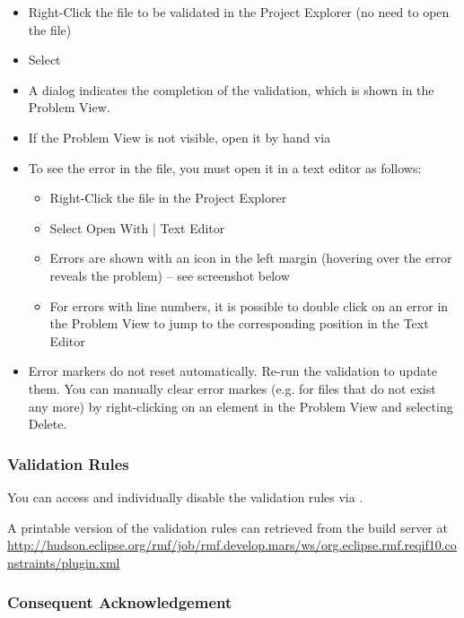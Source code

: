 \begin{itemize}
\item    Right-Click the file to be validated in the Project Explorer (no need to open the file)
\item    Select 
\item    A dialog indicates the completion of the validation, which is shown in the Problem View.
\item    If the Problem View is not visible, open it by hand via 
\item    To see the error in the file, you must open it in a text editor as follows:
\begin{itemize}
\item        Right-Click the file in the Project Explorer
\item        Select Open With | Text Editor
\item        Errors are shown with an icon in the left margin (hovering over the error reveals the problem) – see screenshot below
\item        For errors with line numbers, it is possible to double click on an error in the Problem View to jump to the corresponding position in the Text Editor
\end{itemize}

\item    Error markers do not reset automatically. Re-run the validation to update them. You can manually clear error markes (e.g. for files that do not exist any more) by right-clicking on an element in the Problem View and selecting Delete.
\end{itemize}

\subsubsection{Validation Rules}

You can access and individually disable the validation rules via .

\begin{info}
A printable version of the validation rules can retrieved from the build server at
\url{http://hudson.eclipse.org/rmf/job/rmf.develop.mars/ws/org.eclipse.rmf.reqif10.constraints/plugin.xml}
\end{info}

\subsubsection{Consequent Acknowledgement}

